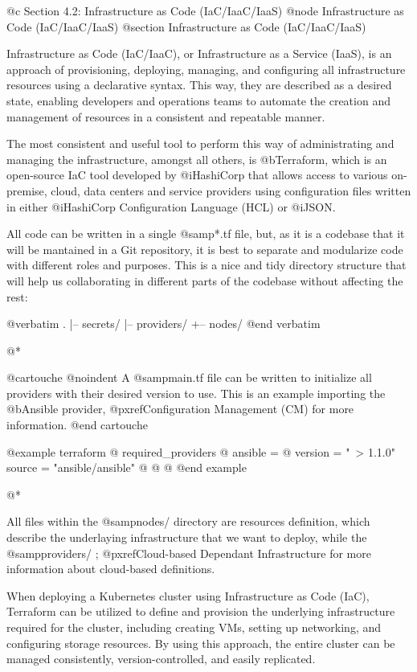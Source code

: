 @c Section 4.2: Infrastructure as Code (IaC/IaaC/IaaS)
@node Infrastructure as Code (IaC/IaaC/IaaS)
@section Infrastructure as Code (IaC/IaaC/IaaS)

Infrastructure as Code (IaC/IaaC), or Infrastructure as a Service (IaaS), is an approach of provisioning, deploying, managing, and configuring all infrastructure resources using a declarative syntax. This way, they are described as a desired state, enabling developers and operations teams to automate the creation and management of resources in a consistent and repeatable manner.

The most consistent and useful tool to perform this way of administrating and managing the infrastructure, amongst all others, is @b{Terraform}, which is an open-source IaC tool developed by @i{HashiCorp} that allows access to various on-premise, cloud, data centers and service providers using configuration files written in either @i{HashiCorp Configuration Language (HCL)} or @i{JSON}.

All code can be written in a single @samp{*.tf} file, but, as it is a codebase that it will be mantained in a Git repository, it is best to separate and modularize code with different roles and purposes. This is a nice and tidy directory structure that will help us collaborating in different parts of the codebase without affecting the rest:

@verbatim
.
|-- secrets/
|-- providers/
+-- nodes/
@end verbatim

@*

@cartouche
@noindent A @samp{main.tf} file can be written to initialize all providers with their desired version to use. This is an example importing the @b{Ansible} provider, @pxref{Configuration Management (CM)} for more information.
@end cartouche

@example
terraform @{
  required_providers @{
    ansible = @{
      version = "~> 1.1.0"
      source = "ansible/ansible"
    @}
  @}
@}
@end example

@*

All files within the @samp{nodes/} directory are resources definition, which describe the underlaying infrastructure that we want to deploy, while the @samp{providers/} ; @pxref{Cloud-based Dependant Infrastructure} for more information about cloud-based definitions.

When deploying a Kubernetes cluster using Infrastructure as Code (IaC), Terraform can be utilized to define and provision the underlying infrastructure required for the cluster, including creating VMs, setting up networking, and configuring storage resources. By using this approach, the entire cluster can be managed consistently, version-controlled, and easily replicated.
